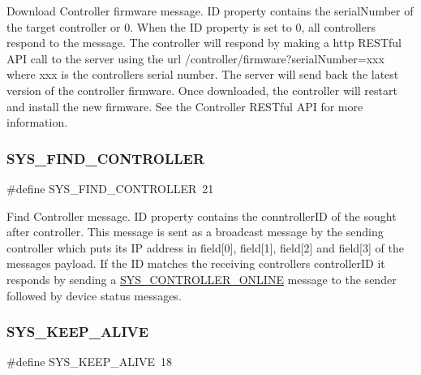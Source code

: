 Download Controller firmware message. ID property contains the serial\+Number of the target controller or 0. When the ID property is set to 0, all controllers respond to the message. The controller will respond by making a http R\+E\+S\+Tful A\+PI call to the server using the url /controller/firmware?serial\+Number=xxx where xxx is the controller\textquotesingle{}s serial number. The server will send back the latest version of the controller firmware. Once downloaded, the controller will restart and install the new firmware. See the Controller R\+E\+S\+Tful A\+PI for more information. \mbox{\label{group___u_d_p_message_i_d_gadfda0e5a5a6a08de555dd55182a4cd87}} 
\subsubsection{\texorpdfstring{S\+Y\+S\+\_\+\+F\+I\+N\+D\+\_\+\+C\+O\+N\+T\+R\+O\+L\+L\+ER}{SYS\_FIND\_CONTROLLER}}
{\footnotesize\ttfamily \#define S\+Y\+S\+\_\+\+F\+I\+N\+D\+\_\+\+C\+O\+N\+T\+R\+O\+L\+L\+ER~21}

Find Controller message. ID property contains the conntroller\+ID of the sought after controller. This message is sent as a broadcast message by the sending controller which puts its IP address in field\mbox{[}0\mbox{]}, field\mbox{[}1\mbox{]}, field\mbox{[}2\mbox{]} and field\mbox{[}3\mbox{]} of the message\textquotesingle{}s payload. If the ID matches the receiving controller\textquotesingle{}s controller\+ID it responds by sending a \hyperlink{group___u_d_p_message_i_d_ga23aab89076591390a1dbc412a3a07314}{S\+Y\+S\+\_\+\+C\+O\+N\+T\+R\+O\+L\+L\+E\+R\+\_\+\+O\+N\+L\+I\+NE} message to the sender followed by device status messages. \mbox{\label{group___u_d_p_message_i_d_ga596f44c285ab391c72addd0e803b0fc4}} 
\subsubsection{\texorpdfstring{S\+Y\+S\+\_\+\+K\+E\+E\+P\+\_\+\+A\+L\+I\+VE}{SYS\_KEEP\_ALIVE}}
{\footnotesize\ttfamily \#define S\+Y\+S\+\_\+\+K\+E\+E\+P\+\_\+\+A\+L\+I\+VE~18}

